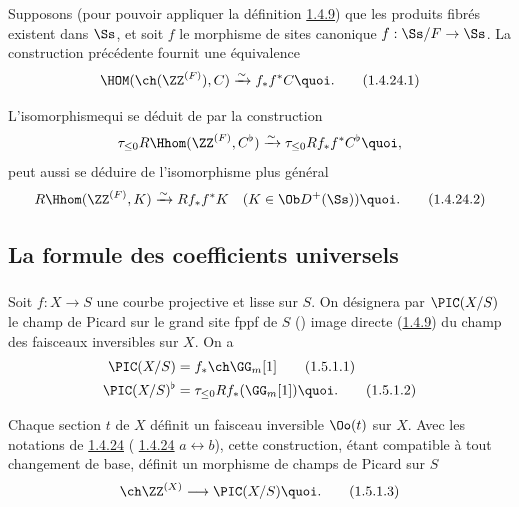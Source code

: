 Supposons (pour pouvoir appliquer la définition
\hyperref[XVIII.subsubsec1.4.9]{1.4.9}) que les
produits fibrés existent dans $\Ss$, et soit $f$ le morphisme
de sites canonique $f:\Ss/F\rightarrow \Ss$. La
construction précédente fournit une équivalence
\begin{equation*}
\HOM(\ch(\ZZ^{(F)}),C)\xrightarrow{\sim}
f_{\ast}f^{\ast}C{\quoi}.\tag{1.4.24.1}
\end{equation*}

L'isomorphisme\pageoriginale qui se déduit de  par la construction
$$
\tau_{\leq 0} R\Hhom(\ZZ^{(F)},C^{\flat})\xrightarrow{\sim}
\tau_{\leq 0} Rf_{\ast} f^{\ast}C^{\flat}{\quoi},
$$
peut aussi se déduire de l'isomorphisme plus général
\begin{equation*}
R\Hhom(\ZZ^{(F)},K)\xrightarrow{\sim}
Rf_{\ast}f^{\ast}K\quad (K\in \Ob D^{+}(\Ss)){\quoi}.\tag{1.4.24.2}
\end{equation*}

\subsection{La formule des coefficients universels}

\subsubsection{}
Soit $f:X\rightarrow S$ une courbe projective et lisse sur $S$. On
désignera par $\PIC(X/S)$ le champ de Picard sur le grand site fppf de
$S$ () image directe (\hyperref[XVIII.subsubsec1.4.9]{1.4.9}) du champ
des faisceaux inversibles sur $X$. On a
\begin{align*}
\PIC(X/S)&= f_{\ast}\ch\GG_{m}[1]\tag{1.5.1.1}\\
\PIC(X/S)^{\flat} &=\tau_{\leq 0}
Rf_{\ast}(\GG_{m}[1]){\quoi}.\tag{1.5.1.2}
\end{align*}

Chaque section $t$ de $X$ définit un faisceau inversible $\Oo(t)$
sur $X$. Avec les notations de \hyperref[XVIII.subsubsec1.4.24]{1.4.24} (\cf
\hyperref[XVIII.subsubsec1.4.24]{1.4.24} $a\leftrightarrow b$), cette
construction, étant compatible à tout changement de base, 
définit un morphisme de champs de Picard sur $S$
\begin{equation*}
\ch \ZZ^{(X)}\longrightarrow \PIC(X/S){\quoi}.\tag{1.5.1.3}
\end{equation*}

